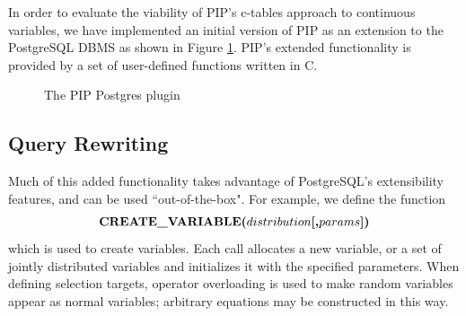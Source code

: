 In order to evaluate the viability of PIP's c-tables approach to continuous variables, we have implemented an initial version of PIP as an extension to the PostgreSQL DBMS as shown in Figure \ref{fig:blockdiag}.  PIP's extended functionality is provided by a set of user-defined functions written in C.  

\begin{figure}
\begin{center}
\caption{The PIP Postgres plugin}
\label{fig:blockdiag}
\end{center}
\vspace*{-0.3in}
\end{figure}

\subsection{Query Rewriting}
Much of this added functionality takes advantage of PostgreSQL's extensibility features, and can be used ``out-of-the-box".  For example, we define the function 
\[
\mbox{\textbf{CREATE\_VARIABLE($distribution$[,$params$])}}
\]
which is used to create variables.  Each call allocates a new variable, or a set of jointly distributed variables and initializes it with the specified parameters.  When defining selection targets, operator overloading is used to make random variables appear as normal variables; arbitrary equations may be constructed in this way.  

